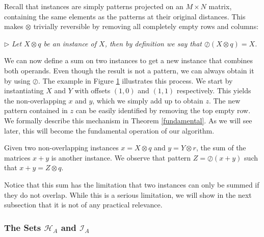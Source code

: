 \documentclass{llncs}
\begin{document}
Recall that instances are simply patterns projected on an $M\times N$ matrix, containing the same elements as the patterns at their original distances. This makes $\otimes$ trivially reversible by removing all completely empty rows and columns:

\smallskip
\noindent $\triangleright$
\emph{Let $X \otimes {q}$ be an instance of $X$, then by definition we say that $\oslash(X \otimes {q}) = X$.}
\smallskip

We can now define a sum on two instances to get a new instance that combines both operands. Even though the result is not a pattern, we can always obtain it by using $\oslash$. The example in Figure \ref{example2} illustrates this process. We start by instantiating $X$ and $Y$ with offsets $(1,0)$ and $(1,1)$ respectively. This yields the non-overlapping ${x}$ and ${y}$, which we simply add up to obtain ${z}$. The new pattern contained in ${z}$ can be easily identified by removing the top empty row. We formally describe this mechanism in Theorem \ref{fundamental}. As we will see later, this will become the fundamental operation of our algorithm.

\begin{figure}


\label{example2}
\end{figure}

\begin{theorem}\label{fundamental}
Given two non-overlapping instances ${x}=X\otimes {q}$ and ${y}=Y\otimes {r}$, the sum of the matrices ${x} + {y}$ is another instance. We observe that pattern $Z=\oslash({x} + {y})$ such that ${x} + {y} = Z\otimes {q}$.
\end{theorem}

Notice that this sum has the limitation that two instances can only be summed if they do not overlap. While this is a serious limitation, we will show in the next subsection that it is not of any practical relevance.


\subsubsection{The Sets $\mathcal{H}_A$ and $\mathcal{I}_A$}\label{thesetH}

\end{document}
